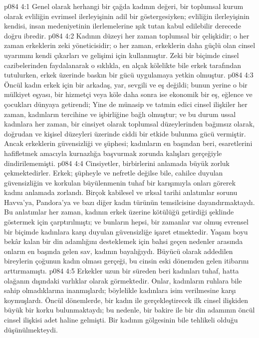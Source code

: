 \vs p084 4:1 Genel olarak herhangi bir çağda kadının değeri, bir toplumsal kurum olarak evliliğin evrimsel ilerleyişinin adil bir göstergesiyken; evliliğin ilerleyişinin kendisi, insan medeniyetinin ilerlemelerine ışık tutan kabul edilebilir derecede doğru ibredir.
\vs p084 4:2 Kadının düzeyi her zaman toplumsal bir çelişkidir; o her zaman erkeklerin zeki yöneticisidir; o her zaman, erkeklerin daha güçlü olan cinsel uyarımını kendi çıkarları ve gelişimi için kullanmıştır. Zeki bir biçimde cinsel cazibelerinden faydalanarak o sıklıkla, en alçak kölelikte bile erkek tarafından tutulurken, erkek üzerinde baskın bir gücü uygulamaya yetkin olmuştur.
\vs p084 4:3 Öncül kadın erkek için bir arkadaş, yar, sevgili ve eş değildi; bunun yerine o bir mülkiyet eşyası, bir hizmetçi veya köle daha sonra ise ekonomik bir eş, eğlence ve çocukları dünyaya getirendi; Yine de münasip ve tatmin edici cinsel ilişkiler her zaman, kadınların tercihine ve işbirliğine bağlı olmuştur; ve bu durum ussal kadınlara her zaman, bir cinsiyet olarak toplumsal düzeylerinden bağımsız olarak, doğrudan ve kişisel düzeyleri üzerinde ciddi bir etkide bulunma gücü vermiştir. Ancak erkeklerin güvensizliği ve şüphesi; kadınların en başından beri, esaretlerini hafifletmek amacıyla kurnazlığa başvurmak zorunda kalışları gerçeğiyle dindirilememişti.
\vs p084 4:4 Cinsiyetler, birbirlerini anlamada büyük zorluk çekmektedirler. Erkek; şüpheyle ve nefretle değilse bile, cahilce duyulan güvensizliğin ve korkulan büyülenmenin tuhaf bir karışımıyla onları görerek kadını anlamada zorlandı. Birçok kabilesel ve ırksal tarihi anlatımlar sorunu Havva’ya, Pandora’ya ve bazı diğer kadın türünün temsilcisine dayandırmaktaydı. Bu anlatımlar her zaman, kadının erkek üzerine kötülüğü getirdiği şeklinde göstermek için çarptırılmıştı; ve bunların hepsi, bir zamanlar var olmuş evrensel bir biçimde kadınlara karşı duyulan güvensizliğe işaret etmektedir. Yaşam boyu bekâr kalan bir din adamlığını desteklemek için bahsi geçen nedenler arasında onların en başında gelen sav, kadının bayalığıydı. Büyücü olarak addedilen bireylerin çoğunun kadın olması gerçeği, bu cinsin eski dönemden gelen itibarını arttırmamıştı.
\vs p084 4:5 Erkekler uzun bir süreden beri kadınları tuhaf, hatta olağanın dışındaki varlıklar olarak görmektedir. Onlar, kadınların ruhlara bile sahip olmadıklarına inanmışlardı; böylelikle kadınlara isim verilmesine karşı koymuşlardı. Öncül dönemlerde, bir kadın ile gerçekleştirecek ilk cinsel ilişkiden büyük bir korku bulunmaktaydı; bu nedenle, bir bakire ile bir din adamının öncül cinsel ilişkisi adet haline gelmişti. Bir kadının gölgesinin bile tehlikeli olduğu düşünülmekteydi.
